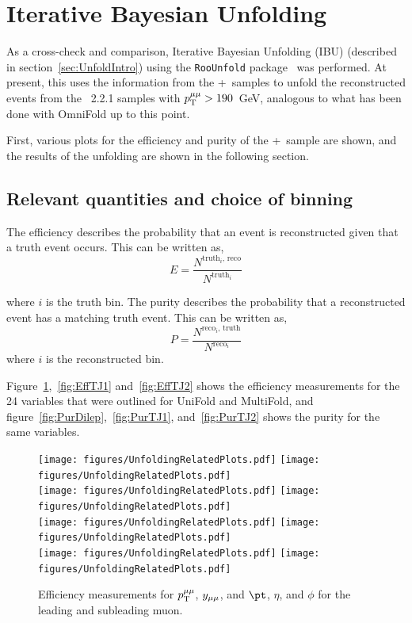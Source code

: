 \section{Iterative Bayesian Unfolding}
\label{app:IBU}

As a cross-check and comparison, Iterative Bayesian Unfolding (IBU) (described in section~\ref{sec:UnfoldIntro}) using the \texttt{RooUnfold} package~\cite{Adye:2011gm} was performed. At present, this uses the information from the \powheg+\pythia~samples to unfold the reconstructed events from the \sherpa~2.2.1 samples with $p_\mathrm{T}^{\mu\mu} > 190$~GeV, analogous to what has been done with OmniFold up to this point.

First, various plots for the efficiency and purity of the \powheg+\pythia~sample are shown, and the results of the unfolding are shown in the following section.

\subsection{Relevant quantities and choice of binning}
The efficiency describes the probability that an event is reconstructed given that a truth event occurs. This can be written as,
\begin{equation}
  E=\frac{N^{\text{truth$_i$, reco}}}{N^{\text{truth$_i$}}}
\end{equation}

where $i$ is the truth bin. The purity describes the probability that a reconstructed event has a matching truth event. This can be written as,
\begin{equation}
  P=\frac{N^{\text{reco$_i$, truth}}}{N^{\text{reco$_i$}}}
\end{equation}
where $i$ is the reconstructed bin.

Figure~\ref{fig:EffDilep},~\ref{fig:EffTJ1} and~\ref{fig:EffTJ2} shows the efficiency measurements for the 24 variables that were outlined for UniFold and MultiFold, and figure~\ref{fig:PurDilep},~\ref{fig:PurTJ1}, and~\ref{fig:PurTJ2} shows the purity for the same variables.

\begin{figure}[h!]
  \centering
  \texttt{[image: figures/UnfoldingRelatedPlots.pdf]}
  \texttt{[image: figures/UnfoldingRelatedPlots.pdf]} \\
  \texttt{[image: figures/UnfoldingRelatedPlots.pdf]}
  \texttt{[image: figures/UnfoldingRelatedPlots.pdf]} \\
  \texttt{[image: figures/UnfoldingRelatedPlots.pdf]}
  \texttt{[image: figures/UnfoldingRelatedPlots.pdf]} \\
  \texttt{[image: figures/UnfoldingRelatedPlots.pdf]}
  \texttt{[image: figures/UnfoldingRelatedPlots.pdf]} \\
  \caption{Efficiency measurements for $p_\mathrm{T}^{\mu\mu}$, $y_{\mu\mu}$, and $\pt$, $\eta$, and $\phi$ for the leading and subleading muon.}
  \label{fig:EffDilep}
\end{figure}

